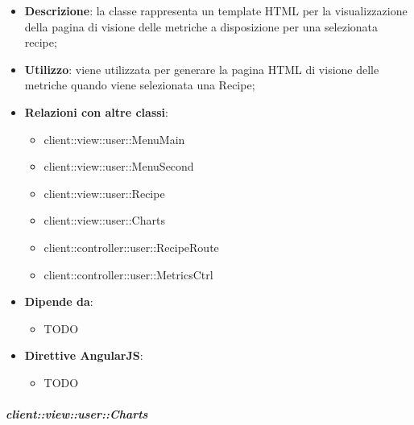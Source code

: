 			\begin{itemize}
				\item \textbf{Descrizione}: la classe rappresenta un template HTML per la visualizzazione della pagina di visione delle metriche a disposizione per una selezionata recipe;
				\item \textbf{Utilizzo}: viene utilizzata per generare la pagina HTML di visione delle metriche quando viene selezionata una Recipe;
				\item \textbf{Relazioni con altre classi}:
					\begin{itemize}
						\item client::view::user::MenuMain
						\item client::view::user::MenuSecond
						\item client::view::user::Recipe
						\item client::view::user::Charts
						\item client::controller::user::RecipeRoute
						\item client::controller::user::MetricsCtrl
					\end{itemize}
				\item \textbf{Dipende da}:
					\begin{itemize}
						\item TODO
					\end{itemize}
				\item \textbf{Direttive AngularJS}:
					\begin{itemize}
						\item TODO
					\end{itemize}
			\end{itemize}

		\subparagraph{client::view::user::Charts} %
		\label{subp:bdsm_app_client_view_user_charts}

